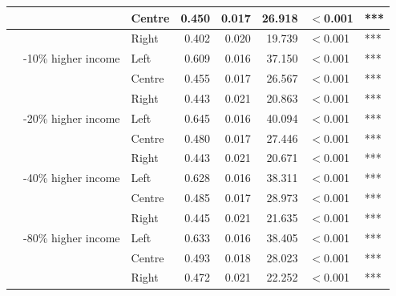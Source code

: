 \begin{longtable}[t]{>{\raggedright\arraybackslash}p{4cm}>{\raggedright\arraybackslash}p{4cm}>{\raggedright\arraybackslash}p{2.5cm}rrrll}
\cmidrule{3-8}\nopagebreak
 &  & Centre & 0.450 & 0.017 & 26.918 & $<$0.001 & ***\\
\cmidrule{3-8}\nopagebreak
 &  & Right & 0.402 & 0.020 & 19.739 & $<$0.001 & ***\\
\cmidrule{2-8}\nopagebreak
 & 6-10\% higher income & Left & 0.609 & 0.016 & 37.150 & $<$0.001 & ***\\
\cmidrule{3-8}\nopagebreak
 &  & Centre & 0.455 & 0.017 & 26.567 & $<$0.001 & ***\\
\cmidrule{3-8}\nopagebreak
 &  & Right & 0.443 & 0.021 & 20.863 & $<$0.001 & ***\\
\cmidrule{2-8}\nopagebreak
 & 11-20\% higher income & Left & 0.645 & 0.016 & 40.094 & $<$0.001 & ***\\
\cmidrule{3-8}\nopagebreak
 &  & Centre & 0.480 & 0.017 & 27.446 & $<$0.001 & ***\\
\cmidrule{3-8}\nopagebreak
 &  & Right & 0.443 & 0.021 & 20.671 & $<$0.001 & ***\\
\cmidrule{2-8}\nopagebreak
 & 21-40\% higher income & Left & 0.628 & 0.016 & 38.311 & $<$0.001 & ***\\
\cmidrule{3-8}\nopagebreak
 &  & Centre & 0.485 & 0.017 & 28.973 & $<$0.001 & ***\\
\cmidrule{3-8}\nopagebreak
 &  & Right & 0.445 & 0.021 & 21.635 & $<$0.001 & ***\\
\cmidrule{2-8}\nopagebreak
 & 41-80\% higher income & Left & 0.633 & 0.016 & 38.405 & $<$0.001 & ***\\
\cmidrule{3-8}\nopagebreak
 &  & Centre & 0.493 & 0.018 & 28.023 & $<$0.001 & ***\\
\cmidrule{3-8}\nopagebreak
 &  & Right & 0.472 & 0.021 & 22.252 & $<$0.001 & ***\\
\bottomrule
\end{longtable}
